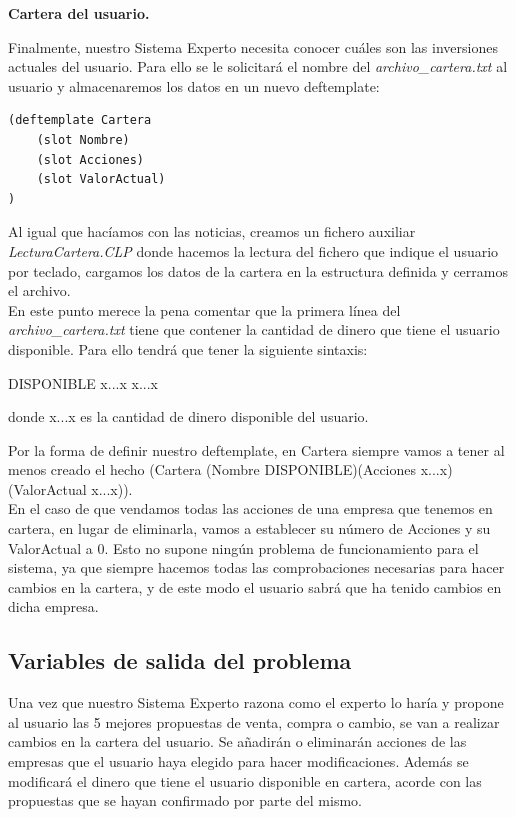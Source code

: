 \documentclass[12pt]{article}
\begin{document}
\begin{center}
	\textbf{Cartera del usuario.}
\end{center}
Finalmente, nuestro Sistema Experto necesita conocer cuáles son las inversiones actuales del usuario. Para ello se le solicitará el nombre del \textit{archivo\_cartera.txt} al usuario y almacenaremos los datos en un nuevo deftemplate:
\begin{lstlisting}
(deftemplate Cartera
	(slot Nombre)
	(slot Acciones)
	(slot ValorActual)
)
\end{lstlisting}
Al igual que hacíamos con las noticias, creamos un fichero auxiliar \textit{LecturaCartera.CLP} donde hacemos la lectura del fichero que indique el usuario por teclado, cargamos los datos de la cartera en la estructura definida y cerramos el archivo.\\

En este punto merece la pena comentar que la primera línea del \textit{archivo\_cartera.txt} tiene que contener la cantidad de dinero que tiene el usuario disponible. Para ello tendrá que tener la siguiente sintaxis: 
\begin{center}
	DISPONIBLE x...x x...x\\
\end{center}
donde x...x es la cantidad de dinero disponible del usuario. 

Por la forma de definir nuestro deftemplate, en Cartera siempre vamos a tener al menos creado el hecho (Cartera (Nombre DISPONIBLE)(Acciones x...x)(ValorActual x...x)). \\

En el caso de que vendamos todas las acciones de una empresa que tenemos en cartera, en lugar de eliminarla, vamos a establecer su número de Acciones y su ValorActual a 0. Esto no supone ningún problema de funcionamiento para el sistema, ya que siempre hacemos todas las comprobaciones necesarias para hacer cambios en la cartera, y de este modo el usuario sabrá que ha tenido cambios en dicha empresa. 



\subsection{Variables de salida del problema}
Una vez que nuestro Sistema Experto razona como el experto lo haría y propone al usuario las 5 mejores propuestas de venta, compra o cambio, se van a realizar cambios en la cartera del usuario. Se añadirán o eliminarán acciones de las empresas que el usuario haya elegido para hacer modificaciones. Además se modificará el dinero que tiene el usuario disponible en cartera, acorde con las propuestas que se hayan confirmado por parte del mismo. \\
\end{document}
